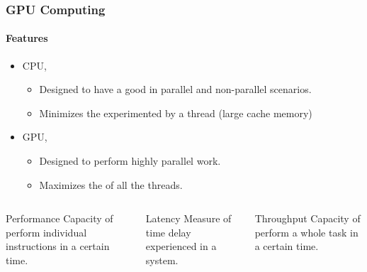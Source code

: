 \begin{frame}
    \frametitle{GPU Computing}
    \framesubtitle{Features}

    \begin{itemize}
        \item CPU,
        \begin{itemize}
            \item Designed to have a good 
                  in parallel and non-parallel scenarios.
            \item Minimizes the  experimented by a thread
                  (large cache memory)
        \end{itemize}
        \item GPU,
            \begin{itemize}
            \item Designed to perform highly parallel work.
            \item Maximizes the  of all the threads.
            \end{itemize}
    \end{itemize}

    \begin{footnotesize}
        \begin{columns}
            \begin{column}{0.35\textwidth}
            \begin{block}{Performance}
                Capacity of perform individual instructions in a certain time.
            \end{block}
            \end{column}
            \begin{column}{0.3\textwidth}
            \begin{block}{Latency}
                Measure of time delay experienced in a system.
            \end{block}
            \end{column}
            \begin{column}{0.3\textwidth}
            \begin{block}{Throughput}
                Capacity of perform a whole task in a certain time.
            \end{block}
            \end{column}
        \end{columns}
    \end{footnotesize}

\end{frame}

